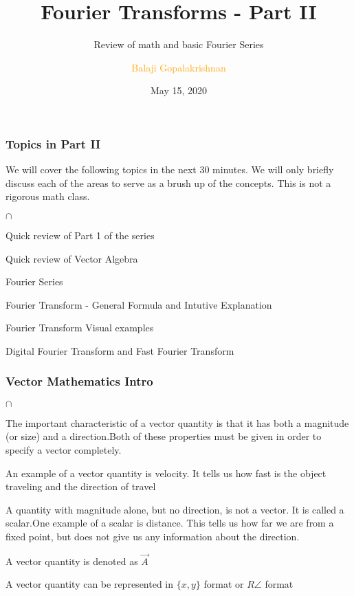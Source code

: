 \documentclass[10pt]{beamer}
\begin{document}
\author{\textcolor{orange}{Balaji Gopalakrishnan}}
\title{Fourier Transforms - Part II}
\subtitle{\huge Review of math and basic Fourier Series}

\date{May 15, 2020}


\begin{frame}[plain]
	\maketitle
\end{frame}

\begin{frame}
	\frametitle{Topics in Part II \hspace{25pt}} 
	We will cover the following topics in the next 30 minutes. We will only briefly discuss each of the areas to serve as a brush up of the concepts. This is not a rigorous math class. \\
	
\begin{list}{$\cap$}{}
	\item Quick review of Part 1 of the series
	\item Quick review of Vector Algebra
	\item Fourier Series
	\item Fourier Transform - General Formula and Intutive Explanation
	\item Fourier Transform Visual examples
	\item Digital Fourier Transform and Fast Fourier Transform
\end{list}
	
\end{frame}

\begin{frame}
	\frametitle{ Vector Mathematics Intro}
	
	\begin{list}{$\cap$}{}
		\item The important characteristic of a vector quantity is that it has both a magnitude (or size) and a direction.Both of these properties must be given in order to specify a vector completely.
		\item An example of a vector quantity is velocity.  It tells us how fast is the object traveling and the direction of travel
		\item A quantity with magnitude alone, but no direction, is not a vector. It is called a scalar.One example of a scalar is distance. This tells us how far we are from a fixed point, but does not give us any information about the direction.
		\item A vector quantity is denoted as  $\vec{A}$
		
		\item A vector quantity can be represented in $\{x,y\} $ format or $R\angle$ format
	\end{list}
\end{frame}
\end{document}
